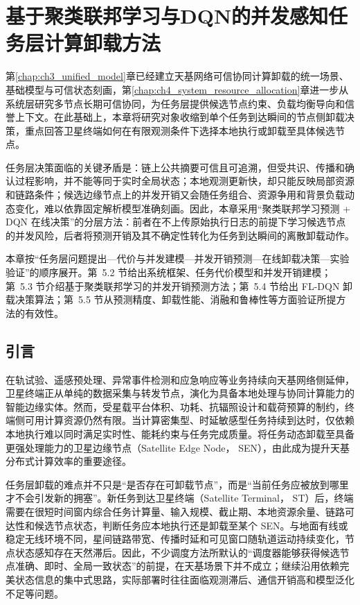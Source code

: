 ﻿\chapter{基于聚类联邦学习与DQN的并发感知任务层计算卸载方法}
\label{chap:ch5_task_offloading}


第\ref{chap:ch3_unified_model}章已经建立天基网络可信协同计算卸载的统一场景、基础模型与可信状态刻画，第\ref{chap:ch4_system_resource_allocation}章进一步从系统层研究多节点长期可信协同，为任务层提供候选节点约束、负载均衡导向和信誉上下文。在此基础上，本章将研究对象收缩到单个任务到达瞬间的节点侧卸载决策，重点回答卫星终端如何在有限观测条件下选择本地执行或卸载至具体候选节点。

任务层决策面临的关键矛盾是：链上公共摘要可信且可追溯，但受共识、传播和确认过程影响，并不能等同于实时全局状态；本地观测更新快，却只能反映局部资源和链路条件；候选边缘节点上的并发开销又会随任务组合、资源争用和背景负载动态变化，难以依靠固定解析模型准确刻画。因此，本章采用“聚类联邦学习预测 + DQN 在线决策”的分层方法：前者在不上传原始执行日志的前提下学习候选节点的并发风险，后者将预测开销及其不确定性转化为任务到达瞬间的离散卸载动作。

本章按“任务层问题提出—代价与并发建模—并发开销预测—在线卸载决策—实验验证”的顺序展开。第~5.2 节给出系统框架、任务代价模型和并发开销建模；第~5.3 节介绍基于聚类联邦学习的并发开销预测方法；第~5.4 节给出 FL-DQN 卸载决策算法；第~5.5 节从预测精度、卸载性能、消融和鲁棒性等方面验证所提方法的有效性。

\section{引言}
\label{sec:ch5_problem_statement}


在轨试验、遥感预处理、异常事件检测和应急响应等业务持续向天基网络侧延伸，卫星终端正从单纯的数据采集与转发节点，演化为具备本地处理与协同计算能力的智能边缘实体。然而，受星载平台体积、功耗、抗辐照设计和载荷预算的制约，终端侧可用计算资源仍然有限。当计算密集型、时延敏感型任务持续到达时，仅依赖本地执行难以同时满足实时性、能耗约束与任务完成质量。将任务动态卸载至具备更强处理能力的卫星边缘节点（Satellite Edge Node， SEN），由此成为提升天基分布式计算效率的重要途径。

任务层卸载的难点并不只是“是否存在可卸载节点”，而是“当前任务应被放到哪里才不会引发新的拥塞”。新任务到达卫星终端（Satellite Terminal， ST）后，终端需要在很短时间窗内综合任务计算量、输入规模、截止期、本地资源余量、链路可达性和候选节点状态，判断任务应本地执行还是卸载至某个 SEN。与地面有线或稳定无线环境不同，星间链路带宽、传播时延和可见窗口随轨道运动持续变化，节点状态感知存在天然滞后。因此，不少调度方法所默认的“调度器能够获得候选节点准确、即时、全局一致状态”的前提，在天基场景下并不成立；继续沿用依赖完美状态信息的集中式思路，实际部署时往往面临观测滞后、通信开销高和模型泛化不足等问题。

